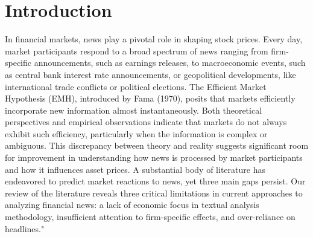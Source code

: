 \section{Introduction}
In financial markets, news play a pivotal role in shaping stock prices. Every day, market participants respond to a broad spectrum of news ranging from firm-specific announcements, such as earnings releases, to macroeconomic events, such as central bank interest rate announcements, or geopolitical developments, like international trade conflicts or political elections. The Efficient Market Hypothesis (EMH), introduced by 
\cite{fama1970efficient} Fama (1970), 
posits that markets efficiently incorporate new information almost instantaneously. Both theoretical perspectives and empirical observations indicate that markets do not always exhibit such efficiency, particularly when the information is complex or ambiguous. This discrepancy between theory and reality suggests significant room for improvement in understanding how news is processed by market participants and how it influences asset prices.
%
A substantial body of literature has endeavored to predict market reactions to news, yet three main gaps persist. Our review of the literature reveals three critical limitations in current approaches to analyzing financial news: a lack of economic focus in textual analysis methodology, insufficient attention to firm-specific effects, and over-reliance on headlines."

